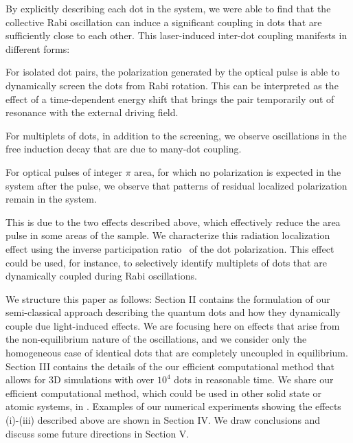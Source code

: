 By explicitly describing each dot in the system, we were able to find that the collective Rabi oscillation can induce a significant coupling in dots that are sufficiently close to each other.
This laser-induced inter-dot coupling manifests in different forms:
\begin{inparaenum}[(i)]
  \item For isolated dot pairs, the polarization generated by the optical pulse is able to dynamically screen the dots from Rabi rotation.
  This can be interpreted as the effect of a time-dependent energy shift that brings the pair temporarily out of resonance with the external driving field.
  \item For multiplets of dots, in addition to the screening, we observe oscillations in the free induction decay that are due to many-dot coupling.
  \item For optical pulses of integer $\pi$ area, for which no polarization is expected in the system after the pulse, we observe that patterns of residual localized polarization remain in the system.
\end{inparaenum}
This is due to the two effects described above, which effectively reduce the area pulse in some areas of the sample.
We characterize this radiation localization effect using the inverse participation ratio~\cite{Schwartz2007} of the dot polarization.
This effect could be used, for instance, to selectively identify multiplets of dots that are dynamically coupled during Rabi oscillations.

We structure this paper as follows: Section II contains the formulation of our semi-classical approach describing the quantum dots and how they dynamically couple due light-induced effects.
We are focusing here on effects that arise from the non-equilibrium nature of the oscillations, and we consider only the homogeneous case of identical dots that are completely uncoupled in equilibrium.
Section III contains the details of the our efficient computational method that allows for 3D simulations with over $10^4$ dots in reasonable time.
We share our efficient computational method, which could be used in other solid state or atomic systems, in \cite{githubpage}.
Examples of our numerical experiments showing the effects (i)-(iii) described above are shown in Section IV.
We draw conclusions and discuss some future directions in Section V.
